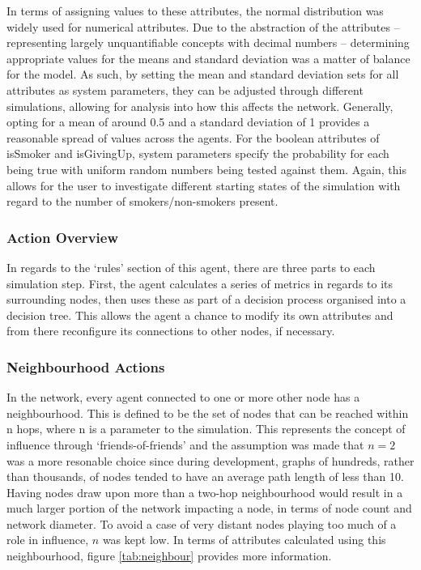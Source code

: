 \documentclass[]{report}
\begin{document}
In terms of assigning values to these attributes, the normal distribution was widely used for numerical attributes. Due to the abstraction of the attributes – representing largely unquantifiable concepts with decimal numbers – determining appropriate values for the means and standard deviation was a matter of balance for the model. As such, by setting the mean and standard deviation sets for all attributes as system parameters, they can be adjusted through different simulations, allowing for analysis into how this affects the network.  Generally, opting for a mean of around 0.5 and a standard deviation of 1 provides a reasonable spread of values across the agents. For the boolean attributes of isSmoker and isGivingUp, system parameters specify the probability for each being true with uniform random numbers being tested against them. Again, this allows for the user to investigate different starting states of the simulation with regard to the number of smokers/non-smokers present.

\subsubsection{Action Overview}
In regards to the `rules' section of this agent, there are three parts to each simulation step. First, the agent calculates a series of metrics in regards to its surrounding nodes, then uses these as part of a decision process organised into a decision tree. This allows the agent a chance to modify its own attributes and from there reconfigure its connections to other nodes, if necessary.
\subsubsection{Neighbourhood Actions}
In the network, every agent connected to one or more other node has a neighbourhood. This is defined to be the set of nodes that can be reached within n hops, where n is a parameter to the simulation. This represents the concept of influence through `friends-of-friends' and the assumption was made that $n=2$ was a more resonable choice since during development,  graphs of hundreds, rather than thousands, of nodes tended to have an average path length of less than 10. Having nodes draw upon more than a two-hop neighbourhood would result in a much larger portion of the network impacting a node, in terms of node count and network diameter. To avoid a case of very distant nodes playing too much of a role in influence, $n$ was kept low. In terms of attributes calculated using this neighbourhood, figure \ref{tab:neighbour} provides more information.
\end{document}
